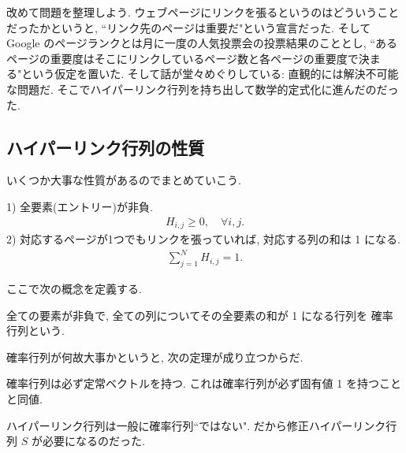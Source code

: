 \documentclass[openany, a4paper, oneside]{jsbook}
\begin{document}
改めて問題を整理しよう.
ウェブページにリンクを張るというのはどういうことだったかというと,
``リンク先のページは重要だ"という宣言だった.
そして Google のページランクとは月に一度の人気投票会の投票結果のこととし,
``あるページの重要度はそこにリンクしているページ数と各ページの重要度で決まる"という仮定を置いた.
そして話が堂々めぐりしている: 直観的には解決不可能な問題だ.
そこでハイパーリンク行列を持ち出して数学的定式化に進んだのだった.
\subsection{ハイパーリンク行列の性質}

いくつか大事な性質があるのでまとめていこう.
\begin{prop}
1) 全要素(エントリー)が非負.
   \begin{align}
    H_{i,j}
    \geqslant
    0, \quad \forall i,j.
   \end{align}
2) 対応するページが1つでもリンクを張っていれば, 対応する列の和は 1 になる.
   \begin{align}
    \sum_{j=1}^{N}    H_{i,j}
    = 1.
   \end{align}
\end{prop}
ここで次の概念を定義する.
\begin{defn}\label{linear-algebra-google-pagerank14}
全ての要素が非負で, 全ての列についてその全要素の和が 1 になる行列を
確率行列という.
\end{defn}
確率行列が何故大事かというと, 次の定理が成り立つからだ.
\begin{thm}\label{linear-algebra-google-pagerank15}
確率行列は必ず定常ベクトルを持つ.
これは確率行列が必ず固有値 1 を持つことと同値.
\end{thm}
ハイパーリンク行列は一般に確率行列``ではない".
だから修正ハイパーリンク行列 $S$ が必要になるのだった.
\end{document}
